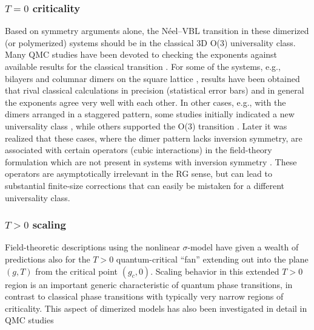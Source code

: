 \documentclass[10pt,pre,aps,twocolumn,showpacs,superscriptaddress,floatfix]{revtex4-1}
\begin{document}
\subsubsection{$T=0$ criticality}
Based on symmetry arguments alone, the N\'eel--VBL transition in these dimerized (or polymerized) systems should be in the classical 3D O($3$) 
universality class. Many QMC studies 
have been devoted to checking the exponents against available results for the classical transition \cite{Sandvik94,Troyer96,Matsumoto01,Wang06,Wenzel08,Wenzel09}.
For some of the systems, e.g., bilayers \cite{Wang06} and columnar dimers on the square lattice \cite{Matsumoto01,Wenzel09,Sandvik10b}, results have been 
obtained that rival classical calculations in precision (statistical error bars) and in general the exponents agree very well with each other. In other 
cases, e.g., with the dimers arranged in a staggered pattern, some studies initially indicated a new universality class \cite{Wenzel08}, while others
supported the O($3$) transition \cite{Jiang12}.  Later it was realized that these cases, where the dimer pattern lacks inversion symmetry, are associated 
with certain operators (cubic interactions) in the field-theory formulation  which are not present in systems with inversion symmetry \cite{Fritz11}. 
These operators are asymptotically irrelevant in the RG sense, but can lead to substantial finite-size corrections that can easily be mistaken for a 
different universality class.

\subsubsection{$T>0$ scaling}
Field-theoretic descriptions using the nonlinear $\sigma$-model \cite{Haldane83,Chakravarty89,Chubukov94} have given a wealth of 
predictions also for the $T>0$ quantum-critical ``fan'' extending out into the plane $(g,T)$  from the critical point $(g_c,0)$. Scaling 
behavior in this extended $T>0$ region is an important generic characteristic of quantum phase transitions, in contrast to classical phase transitions 
with typically very narrow regions of criticality. This aspect of dimerized models has also been investigated in detail in QMC 
studies \cite{Sandvik95,Brenig06,Sandvik11a}
\end{document}
